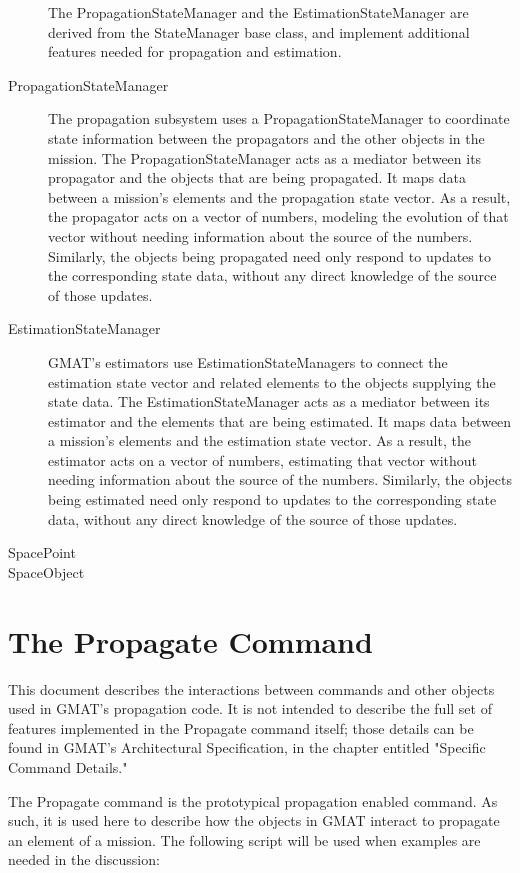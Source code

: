 \documentclass[10pt]{article}
\begin{document}
\begin{description}
The PropagationStateManager and the EstimationStateManager are derived from the StateManager base class, and implement additional features needed for propagation and estimation.
\item[PropagationStateManager]  The propagation subsystem uses a PropagationStateManager to coordinate state information between the propagators and the other objects in the mission.  The PropagationStateManager acts as a mediator between its propagator and the objects that are being propagated.  It maps data between a mission's elements and the propagation state vector.   As a result, the propagator acts on a vector of numbers, modeling the evolution of that vector without needing information about the source of the numbers.  Similarly, the objects being propagated need only respond to updates to the corresponding state data, without any direct knowledge of the source of those updates.
\item[EstimationStateManager]  GMAT's estimators use EstimationStateManagers to connect the estimation state vector and related elements to the objects supplying the state data.  The EstimationStateManager acts as a mediator between its estimator and the elements that are being estimated.  It maps data between a mission's elements and the estimation state vector.   As a result, the estimator acts on a vector of numbers, estimating that vector without needing information about the source of the numbers.  Similarly, the objects being estimated need only respond to updates to the corresponding state data, without any direct knowledge of the source of those updates.
\item[SpacePoint]
\item[SpaceObject]
\end{description}

\section{The Propagate Command}

This document describes the interactions between commands and other objects used in GMAT's propagation code.  It is not intended to describe the full set of features implemented in the Propagate command itself; those details can be found in GMAT's Architectural Specification\cite{GMAT:2008}, in the chapter entitled "Specific Command Details."  

The Propagate command is the prototypical propagation enabled command.  As such, it is used here to describe how the objects in GMAT interact to propagate an element of a mission.  The following script will be used when examples are needed in the discussion:
\end{document}
